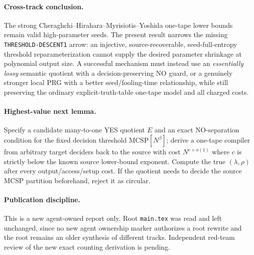 \documentclass[11pt]{article}
\begin{document}
\paragraph{Cross-track conclusion.}
The strong Cheraghchi--Hirahara--Myrisiotis--Yoshida
one-tape lower bounds remain valid high-parameter
seeds.  The present result narrows the missing
\texttt{THRESHOLD-DESCENT1} arrow: an injective,
source-recoverable, seed-full-entropy threshold
reparameterization cannot supply the desired
parameter shrinkage at polynomial output size.
A successful mechanism must instead use an
\emph{essentially lossy} semantic quotient
with a decision-preserving NO guard, or a
genuinely stronger local PRG with a better
seed/fooling-time relationship, while still
preserving the ordinary explicit-truth-table
one-tape model and all charged costs.

\paragraph{Highest-value next lemma.}
Specify a candidate many-to-one YES quotient \(E\) and
an exact NO-separation condition for the
fixed decision threshold \(\mathrm{MCSP}[N^\beta]\);
derive a one-tape compiler from arbitrary target
deciders back to the source with
cost \(N^{c+o(1)}\) where \(c\) is strictly below
the known source lower-bound exponent.
Compute the true \((\lambda,\rho)\) after
every output/access/setup cost.  If the
quotient needs to decide the source MCSP
partition beforehand, reject it as circular.

\paragraph{Publication discipline.}
This is a new agent-owned report only. Root
\texttt{main.tex} was read and left unchanged,
since no new agent ownership marker authorizes
a root rewrite and the root remains an older
synthesis of different tracks. Independent
red-team review of the new exact counting
derivation is pending.



\end{document}
